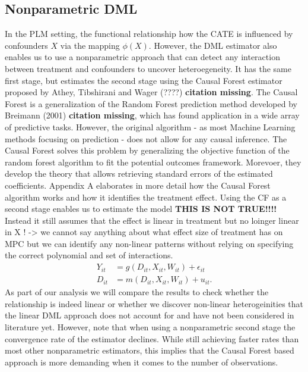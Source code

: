 \subsection{Nonparametric DML} \label{sec:NP-DML}
In the PLM setting, the functional relationship how the CATE is influenced by confounders $X$ via the mapping $\phi(X)$. However, the DML estimator also enables us to use a nonparametric approach that can detect any interaction between treatment and confounders to uncover heteroegeneity. It has the same first stage, but estimates the second stage using the Causal Forest estimator proposed by Athey, Tibshirani and Wager (????) \textbf{citation missing}. The Causal Forest is a generalization of the Random Forest prediction method developed by Breimann (2001) \textbf{citation missing}, which has found application in a wide array of predictive tasks. However, the original algorithm - as most Machine Learning methods focusing on prediction - does not allow for any causal inference. The Causal Forest solves this problem by generalizing the objective function of the random forest algorithm to fit the potential outcomes framework. Morevoer, they develop the theory that allows retrieving standard errors of the estimated coefficients. Appendix A elaborates in more detail how the Causal Forest algorithm works and how it identifies the treatment effect. Using the CF as a second stage enables us to estimate the model 
\textbf{THIS IS NOT TRUE!!!!}
Instead it still assumes that the effect is linear in treatment but no loinger linear in X ! -> we cannot say anything about what effect size of treatment has on MPC but we can identify any non-linear patterns without relying on specifying the correct polynomial and set of interactions.
\begin{align*}
    Y_{it}&=g(D_{it}, X_{it}, W_{it})+\epsilon_{it} \\ 
    D_{it}&=m(D_{it}, X_{it}, W_{it})+u_{it}.
\end{align*}
As part of our analysis we will compare the results to check whether the relationship is indeed linear or whether we discover non-linear heterogeinities that the linear DML approach does not account for and have not been considered in literature yet. However, note that when using a nonparametric second stage the convergence rate of the estimator declines. While still achieving faster rates than most other nonparametric estimators, this implies that the Causal Forest based approach is more demanding when it comes to the number of observations. 